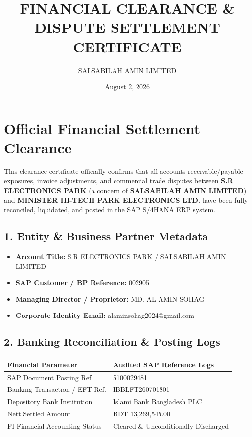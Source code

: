 \documentclass[11pt,a4paper]{article}
\title{\textbf{FINANCIAL CLEARANCE \& DISPUTE SETTLEMENT CERTIFICATE}}
\author{SALSABILAH AMIN LIMITED}
\date{August 2, 2026}
\begin{document}
\maketitle

\section*{Official Financial Settlement Clearance}
This clearance certificate officially confirms that all accounts receivable/payable exposures, invoice adjustments, and commercial trade disputes between \textbf{S.R ELECTRONICS PARK} (a concern of \textbf{SALSABILAH AMIN LIMITED}) and \textbf{MINISTER HI-TECH PARK ELECTRONICS LTD.} have been fully reconciled, liquidated, and posted in the SAP S/4HANA ERP system.

\subsection*{1. Entity \& Business Partner Metadata}
\begin{itemize}
    \item \textbf{Account Title:} S.R ELECTRONICS PARK / SALSABILAH AMIN LIMITED
    \item \textbf{SAP Customer / BP Reference:} 002905
    \item \textbf{Managing Director / Proprietor:} MD. AL AMIN SOHAG
    \item \textbf{Corporate Identity Email:} alaminsohag2024@gmail.com
\end{itemize}

\subsection*{2. Banking Reconciliation \& Posting Logs}
\begin{center}
\begin{tabular}{|l|l|}
\hline
\textbf{Financial Parameter} & \textbf{Audited SAP Reference Logs} \\
\hline
SAP Document Posting Ref. & 5100029481 \\
Banking Transaction / EFT Ref. & IBBLFT260701801 \\
Depository Bank Institution & Islami Bank Bangladesh PLC \\
Nett Settled Amount & BDT 13,269,545.00 \\
FI Financial Accounting Status & Cleared \& Unconditionally Discharged \\
\hline
\end{tabular}
\end{center}
\end{document}
